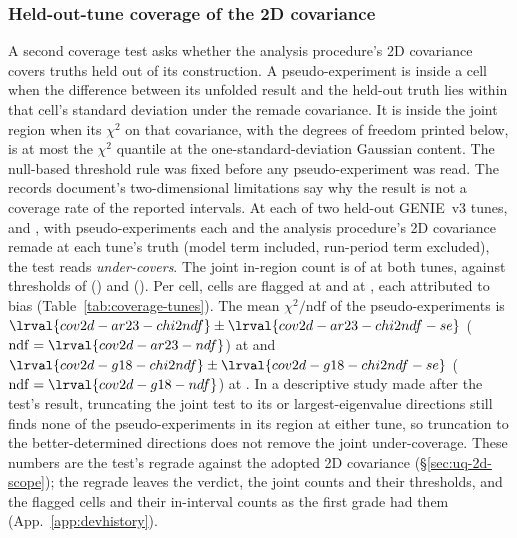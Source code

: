 \subsubsection{Held-out-tune coverage of the 2D covariance}
\label{sec:coverage-tunes}
A second coverage test asks whether the analysis procedure's 2D covariance covers truths held out of its construction. A pseudo-experiment is inside a cell when the difference between its unfolded result and the held-out truth lies within that cell's standard deviation under the remade covariance. It is inside the joint region when its $\chi^{2}$ on that covariance, with the degrees of freedom printed below, is at most the $\chi^{2}$ quantile at the one-standard-deviation Gaussian content. The null-based threshold rule was fixed before any pseudo-experiment was read. The records document's two-dimensional limitations say why the result is not a coverage rate of the reported intervals. At each of two held-out GENIE~v3 tunes,  and , with  pseudo-experiments each and the analysis procedure's 2D covariance remade at each tune's truth (model term included, run-period term excluded), the test reads \emph{under-covers}. The joint in-region count is  of  at both tunes, against thresholds of  () and  (). Per cell,  cells are flagged at  and  at , each attributed to bias (Table~\ref{tab:coverage-tunes}). The mean $\chi^{2}/\mathrm{ndf}$ of the pseudo-experiments is $\lrval{cov2d-ar23-chi2ndf}\pm\lrval{cov2d-ar23-chi2ndf-se}$ ($\mathrm{ndf}=\lrval{cov2d-ar23-ndf}$) at  and $\lrval{cov2d-g18-chi2ndf}\pm\lrval{cov2d-g18-chi2ndf-se}$ ($\mathrm{ndf}=\lrval{cov2d-g18-ndf}$) at . In a descriptive study made after the test's result, truncating the joint test to its  or  largest-eigenvalue directions still finds none of the  pseudo-experiments in its region at either tune, so truncation to the better-determined directions does not remove the joint under-coverage. These numbers are the test's regrade against the adopted 2D covariance (\S\ref{sec:uq-2d-scope}); the regrade leaves the verdict, the joint counts and their thresholds, and the flagged cells and their in-interval counts as the first grade had them (App.~\ref{app:devhistory}).
